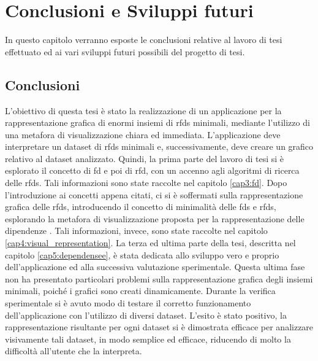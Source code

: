 \chapter{Conclusioni e Sviluppi futuri} %
%
In questo capitolo verranno esposte le conclusioni relative al lavoro di tesi effettuato ed ai vari sviluppi futuri possibili del progetto di tesi.

\section{Conclusioni}
L'obiettivo di questa tesi \`{e} stato la realizzazione di un applicazione per la rappresentazione grafica di enormi insiemi di \acrlong{rfds} minimali, mediante l'utilizzo di una metafora di visualizzazione chiara ed immediata. L'applicazione deve interpretare un dataset di \acrshort{rfds} minimali e, successivamente, deve creare un grafico relativo al dataset analizzato. Quindi, la prima parte del lavoro di tesi si \`{e} esplorato il concetto di \acrlong{fd} e poi di \acrlong{rfd}, con un accenno agli algoritmi di ricerca delle \acrlong{rfds}. Tali informazioni sono state raccolte nel capitolo \ref{cap3:fd}. Dopo l'introduzione ai concetti appena citati, ci si \`{e} soffermati sulla rappresentazione grafica delle \acrlong{rfds}, introducendo il concetto di minimalit\`{a} delle \acrlong{fds} e \acrlong{rfds}, esplorando la metafora di visualizzazione proposta per la rappresentazione delle dipendenze \cite{mdvisualization}. Tali informazioni, invece, sono state raccolte nel capitolo \ref{cap4:visual_representation}. La terza ed ultima parte della tesi, descritta nel capitolo \ref{cap5:dependensee}, \`{e} stata dedicata allo sviluppo vero e proprio dell'applicazione ed alla successiva valutazione sperimentale. Questa ultima fase non ha presentato particolari problemi sulla rappresentazione grafica degli insiemi minimali, poich\'{e} i grafici sono creati dinamicamente. Durante la verifica sperimentale si \`{e} avuto modo di testare il corretto funzionamento dell'applicazione con l'utilizzo di diversi dataset. L'esito \`{e} stato positivo, la rappresentazione risultante per ogni dataset si \`{e} dimostrata efficace per analizzare visivamente tali dataset, in modo semplice ed efficace, riducendo di molto la difficolt\`{a} all'utente che la interpreta.

